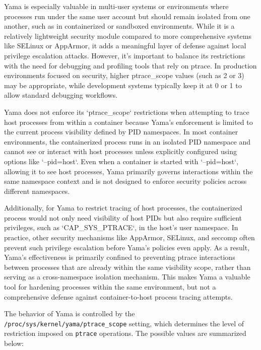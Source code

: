 \documentclass[12pt]{report}
\begin{document}
\begin{doublespace}
Yama is especially valuable in multi-user systems or environments where processes run under the same user account but should remain isolated from one another, such as in containerized or sandboxed environments. While it is a relatively lightweight security module compared to more comprehensive systems like SELinux or AppArmor, it adds a meaningful layer of defense against local privilege escalation attacks. However, it’s important to balance its restrictions with the need for debugging and profiling tools that rely on ptrace. In production environments focused on security, higher ptrace\_scope values (such as 2 or 3) may be appropriate, while development systems typically keep it at 0 or 1 to allow standard debugging workflows.

Yama does not enforce its `ptrace\_scope` restrictions when attempting to trace host processes from within a container because Yama’s enforcement is limited to the current process visibility defined by PID namespaces. In most container environments, the containerized process runs in an isolated PID namespace and cannot see or interact with host processes unless explicitly configured using options like `--pid=host`. Even when a container is started with `--pid=host`, allowing it to see host processes, Yama primarily governs interactions within the same namespace context and is not designed to enforce security policies across different namespaces.

Additionally, for Yama to restrict tracing of host processes, the containerized process would not only need visibility of host PIDs but also require sufficient privileges, such as `CAP\_SYS\_PTRACE`, in the host’s user namespace. In practice, other security mechanisms like AppArmor, SELinux, and seccomp often prevent such privilege escalation before Yama’s policies even apply. As a result, Yama’s effectiveness is primarily confined to preventing ptrace interactions between processes that are already within the same visibility scope, rather than serving as a cross-namespace isolation mechanism. This makes Yama a valuable tool for hardening processes within the same environment, but not a comprehensive defense against container-to-host process tracing attempts.


The behavior of Yama is controlled by the \texttt{/proc/sys/kernel/yama/ptrace\_scope} setting, which determines the level of restriction imposed on \texttt{ptrace} operations. The possible values are summarized below:


\end{doublespace}
\end{document}
